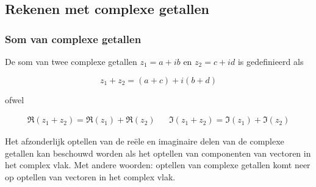 \subsection{Rekenen met complexe getallen}

\subsubsection{Som van complexe getallen}

\begin{definitie}
De som van twee complexe getallen $z_{1}=a+ib$ en $z_{2}=c+id$ is gedefinieerd als\\

\begin{framed}
\[ z_{1}+z_{2}=(a+c)+i(b+d) \]
\end{framed}

ofwel

\begin{framed}
\[	
\begin{array}{ccc}
\Re(z_{1}+z_{2})=\Re(z_{1})+\Re(z_{2}) &  & \Im(z_{1}+z_{2})=\Im(z_{1})+\Im(z_{2}) 
\end{array} 
\]
\end{framed}
\end{definitie}

Het afzonderlijk optellen van de re\"{e}le en imaginaire delen van de complexe getallen kan beschouwd worden als het optellen van componenten van vectoren in het complex vlak. Met andere woorden: optellen van complexe getallen komt neer op optellen van vectoren in het complex vlak.\\



\begin{figure}[H]
	\centering 
	 
\end{figure}




